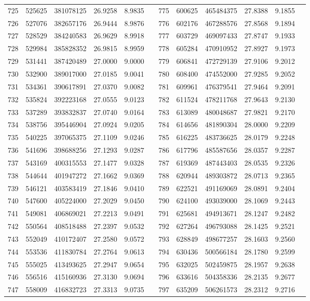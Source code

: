 \begin{longtable}{SSSSSSSSSSSS}
725&525625&381078125&26.9258&8.9835&&775&600625&465484375&27.8388&9.1855\\
726&527076&382657176&26.9444&8.9876&&776&602176&467288576&27.8568&9.1894\\
727&528529&384240583&26.9629&8.9918&&777&603729&469097433&27.8747&9.1933\\
728&529984&385828352&26.9815&8.9959&&778&605284&470910952&27.8927&9.1973\\
729&531441&387420489&27.0000&9.0000&&779&606841&472729139&27.9106&9.2012\\
730&532900&389017000&27.0185&9.0041&&780&608400&474552000&27.9285&9.2052\\
731&534361&390617891&27.0370&9.0082&&781&609961&476379541&27.9464&9.2091\\
732&535824&392223168&27.0555&9.0123&&782&611524&478211768&27.9643&9.2130\\
733&537289&393832837&27.0740&9.0164&&783&613089&480048687&27.9821&9.2170\\
734&538756&395446904&27.0924&9.0205&&784&614656&481890304&28.0000&9.2209\\
735&540225&397065375&27.1109&9.0246&&785&616225&483736625&28.0179&9.2248\\
736&541696&398688256&27.1293&9.0287&&786&617796&485587656&28.0357&9.2287\\
737&543169&400315553&27.1477&9.0328&&787&619369&487443403&28.0535&9.2326\\
738&544644&401947272&27.1662&9.0369&&788&620944&489303872&28.0713&9.2365\\
739&546121&403583419&27.1846&9.0410&&789&622521&491169069&28.0891&9.2404\\
740&547600&405224000&27.2029&9.0450&&790&624100&493039000&28.1069&9.2443\\
741&549081&406869021&27.2213&9.0491&&791&625681&494913671&28.1247&9.2482\\
742&550564&408518488&27.2397&9.0532&&792&627264&496793088&28.1425&9.2521\\
743&552049&410172407&27.2580&9.0572&&793&628849&498677257&28.1603&9.2560\\
744&553536&411830784&27.2764&9.0613&&794&630436&500566184&28.1780&9.2599\\
745&555025&413493625&27.2947&9.0654&&795&632025&502459875&28.1957&9.2638\\
746&556516&415160936&27.3130&9.0694&&796&633616&504358336&28.2135&9.2677\\
747&558009&416832723&27.3313&9.0735&&797&635209&506261573&28.2312&9.2716\\

\end{longtable}

